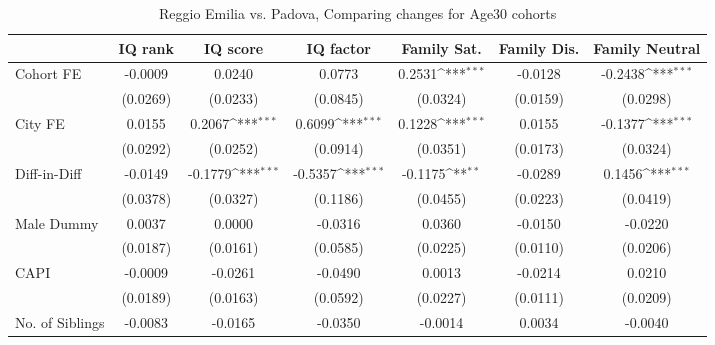 \begin{table}[htbp]\centering
\def\sym#1{\ifmmode^{#1}\else\(^{#1}\)\fi}
\caption{Reggio Emilia vs. Padova, Comparing changes for Age30 cohorts}
\begin{tabular}{l*{6}{c}}
\toprule
            &\multicolumn{1}{c}{IQ rank}&\multicolumn{1}{c}{IQ score}&\multicolumn{1}{c}{IQ factor}&\multicolumn{1}{c}{Family Sat.}&\multicolumn{1}{c}{Family Dis.}&\multicolumn{1}{c}{Family Neutral}\\
\midrule
Cohort FE   &     -0.0009         &      0.0240         &      0.0773         &      0.2531\sym{***}&     -0.0128         &     -0.2438\sym{***}\\
            &    (0.0269)         &    (0.0233)         &    (0.0845)         &    (0.0324)         &    (0.0159)         &    (0.0298)         \\
\addlinespace
City FE     &      0.0155         &      0.2067\sym{***}&      0.6099\sym{***}&      0.1228\sym{***}&      0.0155         &     -0.1377\sym{***}\\
            &    (0.0292)         &    (0.0252)         &    (0.0914)         &    (0.0351)         &    (0.0173)         &    (0.0324)         \\
\addlinespace
Diff-in-Diff&     -0.0149         &     -0.1779\sym{***}&     -0.5357\sym{***}&     -0.1175\sym{**} &     -0.0289         &      0.1456\sym{***}\\
            &    (0.0378)         &    (0.0327)         &    (0.1186)         &    (0.0455)         &    (0.0223)         &    (0.0419)         \\
\addlinespace
Male Dummy  &      0.0037         &      0.0000         &     -0.0316         &      0.0360         &     -0.0150         &     -0.0220         \\
            &    (0.0187)         &    (0.0161)         &    (0.0585)         &    (0.0225)         &    (0.0110)         &    (0.0206)         \\
\addlinespace
CAPI        &     -0.0009         &     -0.0261         &     -0.0490         &      0.0013         &     -0.0214         &      0.0210         \\
            &    (0.0189)         &    (0.0163)         &    (0.0592)         &    (0.0227)         &    (0.0111)         &    (0.0209)         \\
\addlinespace
No. of Siblings&     -0.0083         &     -0.0165         &     -0.0350         &     -0.0014         &      0.0034         &     -0.0040         \\

\end{tabular}
\end{table}
